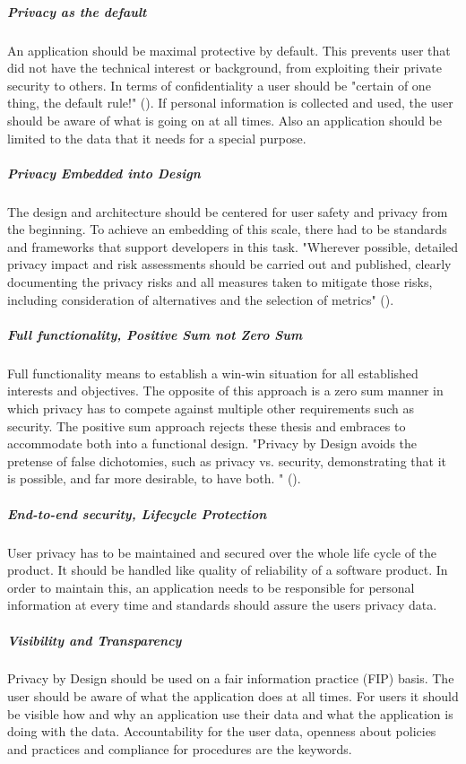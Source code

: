 \subparagraph{Privacy as the default}
An application should be maximal protective by default. This prevents user that did not have the technical interest or background, from exploiting their private security to others. In terms of confidentiality a user should be "certain of one thing, the default rule!" (\cite{cavoukian2009privacy}). If personal information is collected and used, the user should be aware of what is going on at all times. Also an application should be limited to the data that it needs for a special purpose. 

\subparagraph{Privacy Embedded into Design}
The design and architecture should be centered for user safety and privacy from the beginning. To achieve an embedding of this scale, there had to be standards and frameworks that support developers in this task. "Wherever possible, detailed privacy impact and risk assessments should be carried out and published, clearly documenting the privacy risks and all measures taken to mitigate those risks, including consideration of alternatives and the selection of metrics" (\cite{langheinrich2001privacy}).

\subparagraph{Full functionality, Positive Sum not Zero Sum}
Full functionality means to establish a win-win situation for all established interests and objectives. The opposite of this approach is a zero sum manner in which privacy has to compete against multiple other requirements such as security. The positive sum approach rejects these thesis and embraces to accommodate both into a functional design. "Privacy by Design avoids the pretense of false dichotomies, such as privacy vs. security, demonstrating that it is possible, and far more desirable, to have both.
" (\cite{cavoukian2009privacy}).

\subparagraph{End-to-end security, Lifecycle Protection}
User privacy has to be maintained and secured over the whole life cycle of the product. It should be handled like quality of reliability of a software product. In order to maintain this, an application needs to be responsible for personal information at every time and standards should assure the users privacy data.

\subparagraph{Visibility and Transparency}
Privacy by Design should be used on a fair information practice (FIP) basis. The user should be aware of what the application does at all times. For users it should be visible how and why an application use their data and what the application is doing with the data. Accountability for the user data, openness about policies and practices and compliance for procedures are the keywords. 

